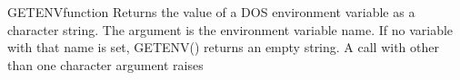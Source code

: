 \begin{XbaseEntry}{GETENV}{function}
Returns the value of a DOS environment variable as a character string.
\Syntax
{}
\Usage
The argument is the environment variable name. If no variable with that name
is set, GETENV() returns an empty string. A call with other than one character
argument raises 
\Examples
{}
\end{XbaseEntry}

